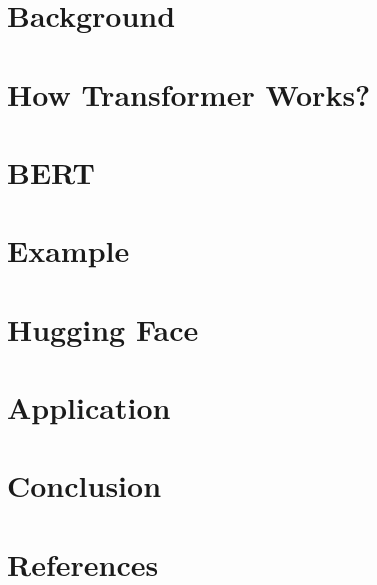 \section[Back]{Background}


\section[How]{How Transformer Works?}



\section[BERT]{BERT}


\section[Ex]{Example}


\section[HF]{Hugging Face}


\section[Appln]{Application}


\section[Cncl]{Conclusion}


\section[Refs]{References}
